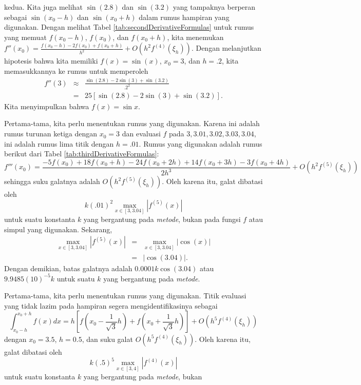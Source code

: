 \begin{description}
kedua. Kita juga melihat $\sin(2.8)$ dan $\sin(3.2)$ yang tampaknya
berperan sebagai $\sin(x_{0}-h)$ dan $\sin(x_{0}+h)$ dalam rumus
hampiran yang digunakan. Dengan melihat Tabel \ref{tab:secondDerivativeFormulas}
untuk rumus yang memuat $f(x_{0}-h)$, $f(x_{0})$, dan $f(x_{0}+h)$,
kita menemukan $f''(x_{0})=\frac{f(x_{0}-h)-2f(x_{0})+f(x_{0}+h)}{h^{2}}+O(h^{2}f^{(4)}(\xi_{h}))$.
Dengan melanjutkan hipotesis bahwa kita memiliki $f(x)=\sin(x)$,
$x_{0}=3$, dan $h=.2$, kita memasukkannya ke rumus untuk memperoleh
\begin{eqnarray*}
f''(3) & \approx & \frac{\sin(2.8)-2\sin(3)+\sin(3.2)}{.2^{2}}\\
 & = & 25\left[\sin(2.8)-2\sin(3)+\sin(3.2)\right].
\end{eqnarray*}
Kita menyimpulkan bahwa $f(x)=\sin x$. 
\item [{\ref{exc:calculusErrors-13}:}] Pertama-tama, kita perlu menentukan
rumus yang digunakan. Karena ini adalah rumus turunan ketiga dengan
$x_{0}=3$ dan evaluasi $f$ pada $3,3.01,3.02,3.03,3.04$, ini adalah
rumus lima titik dengan $h=.01$. Rumus yang digunakan adalah rumus
berikut dari Tabel \ref{tab:thirdDerivativeFormulas}:
\[
f'''(x_{0})=\frac{-5f(x_{0})+18f(x_{0}+h)-24f(x_{0}+2h)+14f(x_{0}+3h)-3f(x_{0}+4h)}{2h^{3}}+O(h^{2}f^{(5)}(\xi_{h}))
\]
sehingga suku galatnya adalah $O(h^{2}f^{(5)}(\xi_{h}))$. Oleh karena
itu, galat dibatasi oleh 
\[
k(.01)^{2}\max_{x\in[3,3.04]}\left|f^{(5)}(x)\right|
\]
untuk suatu konstanta $k$ yang bergantung pada \textit{metode}, bukan
pada fungsi $f$ atau simpul yang digunakan. Sekarang,
\begin{eqnarray*}
\max_{x\in[3,3.04]}\left|f^{(5)}(x)\right| & = & \max_{x\in[3,3.04]}\left|\cos(x)\right|\\
 & = & \left|\cos(3.04)\right|.
\end{eqnarray*}
Dengan demikian, batas galatnya adalah $0.0001k\cos(3.04)$ atau $9.9485(10)^{-5}k$
untuk suatu $k$ yang bergantung pada \textit{metode}.
\item [{\ref{exc:calculusErrors-14}:}] Pertama-tama, kita perlu menentukan
rumus yang digunakan. Titik evaluasi yang tidak lazim pada hampiran
segera mengidentifikasinya sebagai 
\[
\int_{x_{0}-h}^{x_{0}+h}f(x)dx=h\left[f\left(x_{0}-\frac{1}{\sqrt{3}}h\right)+f\left(x_{0}+\frac{1}{\sqrt{3}}h\right)\right]+O(h^{5}f^{(4)}(\xi_{h}))
\]
dengan $x_{0}=3.5$, $h=0.5$, dan suku galat $O(h^{5}f^{(4)}(\xi_{h}))$.
Oleh karena itu, galat dibatasi oleh 
\[
k(.5)^{5}\max_{x\in[3,4]}\left|f^{(4)}(x)\right|
\]
untuk suatu konstanta $k$ yang bergantung pada \textit{metode}, bukan

\end{description}
